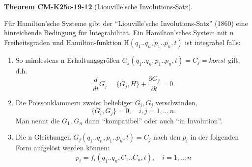 \documentclass[10pt, letterpaper]{article}
\newcommand{\CustomHeading}[3]{%
  \par\medskip\noindent%
  \textbf{#1 #2} \textnormal{(#3)}.\enskip%
}
\newenvironment{THEO}[2]{\CustomHeading{Theorem}{#1}{#2}}{}
\begin{document}
\begin{THEO}{CM-K25c-19-12}{Liouville'sche Involutions-Satz}
Für Hamilton'sche Systeme gibt der ``Liouville'sche Involutions-Satz'' (1860) eine hinreichende Bedingung für Integrabilität.
\noindent
Ein Hamilton'sches System mit n Freiheitsgraden und Hamilton-funktion H$(q_1..q_n,p_1..p_n,t)$ ist integrabel falls:

\begin{enumerate}
\item So mindestens n Erhaltungsgrößen $G_j(q_1..q_n,p_1..p_n,t)=C_j=konst$ gilt, d.h. 
\[\frac{d}{dt}G_j = \{G_j,H\} + \frac{\partial G_j}{\partial t} = 0.\]

\item Die Poissonklammern zweier beliebiger $G_i,G_j$ verschwinden,
\[\{G_i,G_j\} = 0, \quad i,j=1,..,n.\]
Man nennt die $G_1..G_n$ dann ``kompatibel'' oder auch ``in Involution''.

\item Die n Gleichungen $G_j(q_1..q_n,p_1..p_n,t)=C_j$ nach den $p_i$ in der folgenden Form aufgelöst werden können:
\[p_i = f_i(q_1..q_n,C_1..C_n,t), \quad i=1,..,n\]
\end{enumerate}
\end{THEO}
\end{document}
